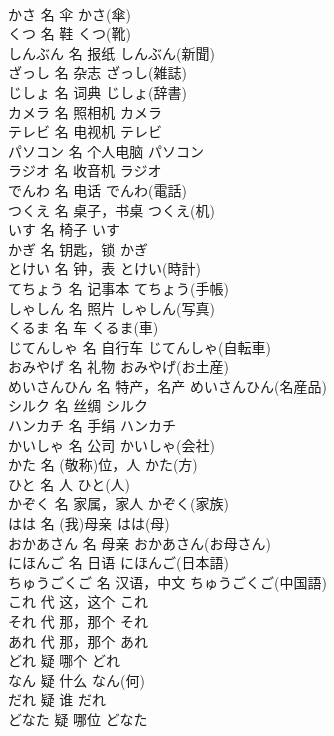 \documentclass[8pt]{extreport}
\begin{document}
\begin{CJK}{UTF8}{min}
\\	かさ	名	伞	かさ(傘)	
\\	くつ	名	鞋	くつ(靴)	
\\	しんぶん	名	报纸	しんぶん(新聞)	
\\	ざっし	名	杂志	ざっし(雑誌)	
\\	じしょ	名	词典	じしょ(辞書)	
\\	カメラ	名	照相机	カメラ	
\\	テレビ	名	电视机	テレビ	
\\	パソコン	名	个人电脑	パソコン	
\\	ラジオ	名	收音机	ラジオ	
\\	でんわ	名	电话	でんわ(電話)	
\\	つくえ	名	桌子，书桌	つくえ(机)	
\\	いす	名	椅子	いす	
\\	かぎ	名	钥匙，锁	かぎ	
\\	とけい	名	钟，表	とけい(時計)	
\\	てちょう	名	记事本	てちょう(手帳)	
\\	しゃしん	名	照片	しゃしん(写真)	
\\	くるま	名	车	くるま(車)	
\\	じてんしゃ	名	自行车	じてんしゃ(自転車)	
\\	おみやげ	名	礼物	おみやげ(お土産)	
\\	めいさんひん	名	特产，名产	めいさんひん(名産品)	
\\	シルク	名	丝绸	シルク	
\\	ハンカチ	名	手绢	ハンカチ	
\\	かいしゃ	名	公司	かいしゃ(会社)	
\\	かた	名	(敬称)位，人	かた(方)	
\\	ひと	名	人	ひと(人)	
\\	かぞく	名	家属，家人	かぞく(家族)	
\\	はは	名	(我)母亲	はは(母)	
\\	おかあさん	名	母亲	おかあさん(お母さん)	
\\	にほんご	名	日语	にほんご(日本語)	
\\	ちゅうごくご	名	汉语，中文	ちゅうごくご(中国語)	
\\	これ	代	这，这个	これ	
\\	それ	代	那，那个	それ	
\\	あれ	代	那，那个	あれ	
\\	どれ	疑	哪个	どれ	
\\	なん	疑	什么	なん(何)	
\\	だれ	疑	谁	だれ	
\\	どなた	疑	哪位	どなた	

\end{CJK}
\end{document}
